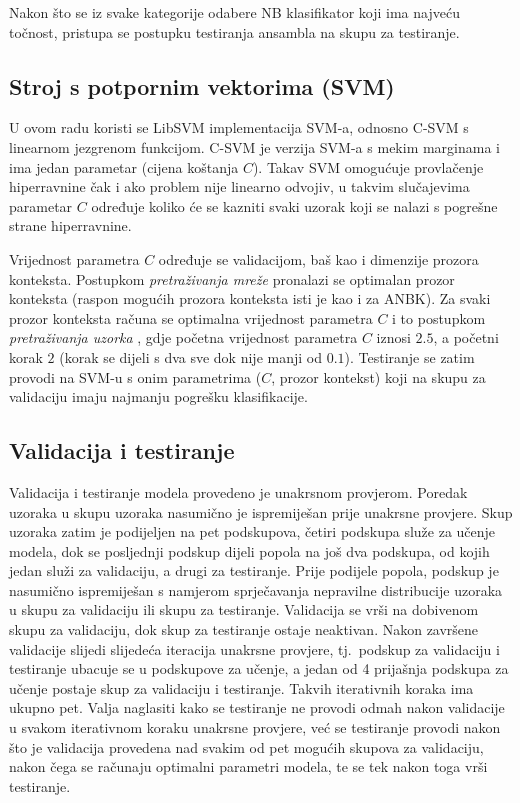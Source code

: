 \documentclass[10pt, a4paper]{article}
\begin{document}
Nakon što se iz svake kategorije odabere NB klasifikator koji ima najveću točnost,
pristupa se postupku testiranja ansambla na skupu za testiranje.

\subsection{Stroj s potpornim vektorima (SVM)}
U ovom radu koristi se LibSVM implementacija \mbox{SVM-a}, odnosno C-SVM s linearnom
jezgrenom funkcijom. 
\mbox{C-SVM} je verzija SVM-a s mekim marginama i ima jedan parametar (cijena koštanja $C$).
Takav SVM omogućuje provlačenje hiperravnine čak i ako problem
nije linearno odvojiv, u takvim slučajevima parametar $C$ određuje koliko će
se kazniti svaki uzorak koji se nalazi s pogrešne strane hiperravnine.

Vrijednost parametra $C$ određuje se validacijom, baš kao
i dimenzije prozora konteksta.
Postupkom \emph{pretraživanja mreže}  pronalazi se
optimalan prozor konteksta (raspon mogućih prozora konteksta
isti je kao i za ANBK). Za svaki prozor konteksta računa se
optimalna vrijednost parametra $C$ i to postupkom \emph{pretraživanja uzorka} ,
gdje početna vrijednost parametra $C$ iznosi $2.5$, a početni korak $2$ (korak se dijeli s dva sve dok nije manji od $0.1$). Testiranje se zatim
provodi na SVM-u s onim parametrima ($C$, prozor kontekst)
koji na skupu za validaciju imaju najmanju pogrešku klasifikacije.

\subsection{Validacija i testiranje}
Validacija i testiranje modela provedeno je unakrsnom provjerom.
Poredak uzoraka u skupu uzoraka nasumično je ispremiješan prije
unakrsne provjere.
Skup uzoraka zatim je podijeljen na pet podskupova, četiri podskupa
služe za učenje modela, dok se posljednji podskup dijeli popola
na još dva podskupa, od kojih jedan služi za validaciju, a drugi za testiranje.
Prije podijele popola, podskup je nasumično ispremiješan s
namjerom sprječavanja nepravilne distribucije uzoraka u skupu za validaciju
ili skupu za testiranje. Validacija se vrši na dobivenom skupu za validaciju, 
dok skup za testiranje ostaje neaktivan. Nakon završene validacije
slijedi slijedeća iteracija unakrsne provjere, tj.~podskup za validaciju
i testiranje ubacuje se u podskupove za učenje, a jedan od 4 prijašnja podskupa
za učenje postaje skup za validaciju i testiranje. Takvih iterativnih koraka ima ukupno
pet. Valja naglasiti kako se testiranje ne provodi odmah nakon validacije u svakom
iterativnom koraku unakrsne provjere, već se testiranje provodi nakon što je validacija
provedena nad svakim od pet mogućih skupova za validaciju, nakon čega se računaju
optimalni parametri modela, te se tek nakon toga vrši testiranje. 
\end{document}
